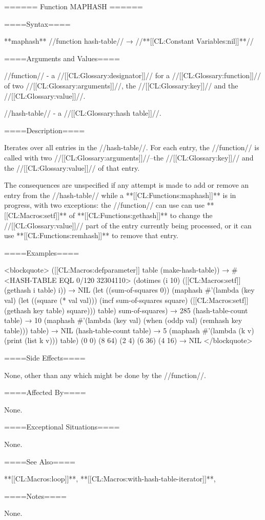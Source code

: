 ====== Function MAPHASH ======

====Syntax====

**maphash** //function hash-table// → //**[[CL:Constant Variables:nil]]**//

====Arguments and Values====

//function// - a //[[CL:Glossary:designator]]// for a //[[CL:Glossary:function]]// of two //[[CL:Glossary:arguments]]//, the //[[CL:Glossary:key]]// and the //[[CL:Glossary:value]]//.

//hash-table// - a //[[CL:Glossary:hash table]]//.

====Description====

Iterates over all entries in the //hash-table//. For each entry, the //function// is called with two //[[CL:Glossary:arguments]]//--the //[[CL:Glossary:key]]// and the //[[CL:Glossary:value]]// of that entry.

The consequences are unspecified if any attempt is made to add or remove an entry from the //hash-table// while a **[[CL:Functions:maphash]]** is in progress, with two exceptions: the //function// can use can use **[[CL:Macros:setf]]** of **[[CL:Functions:gethash]]** to change the //[[CL:Glossary:value]]// part of the entry currently being processed, or it can use **[[CL:Functions:remhash]]** to remove that entry.

====Examples====

<blockquote> ([[CL:Macros:defparameter]] table (make-hash-table)) → #<HASH-TABLE EQL 0/120 32304110> (dotimes (i 10) ([[CL:Macros:setf]] (gethash i table) i)) → NIL (let ((sum-of-squares 0)) (maphash #'(lambda (key val) (let ((square (* val val))) (incf sum-of-squares square) ([[CL:Macros:setf]] (gethash key table) square))) table) sum-of-squares) → 285 (hash-table-count table) → 10 (maphash #'(lambda (key val) (when (oddp val) (remhash key table))) table) → NIL (hash-table-count table) → 5 (maphash #'(lambda (k v) (print (list k v))) table) (0 0) (8 64) (2 4) (6 36) (4 16) → NIL </blockquote>

====Side Effects====

None, other than any which might be done by the //function//.

====Affected By====

None.

====Exceptional Situations====

None.

====See Also====

**[[CL:Macros:loop]]**, **[[CL:Macros:with-hash-table-iterator]]**,

{\secref\TraversalRules}

====Notes====

None.

